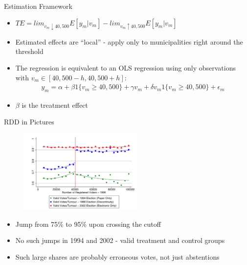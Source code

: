\documentclass[11pt,notes=hide,aspectratio=169,mathserif]{beamer}
\begin{document}
\begin{frame}{Estimation Framework}

\begin{itemize}
\item $ TE = lim_{v_m \downarrow 40,500} E[y_m| v_m] - lim_{v_m \uparrow 40,500} E[y_m| v_m] $
\item Estimated effects are ``local'' - apply only to municipalities right around the threshold
\item The regression is equivalent to an OLS regression using only observations with $v_m \in [40,500 - h, 40,500 + h]$:
\begin{align*}
    y_m = \alpha + \beta 1\{v_m \geq 40,500\} + \gamma v_m + \delta v_m 1\{v_m \geq 40,500\} + \epsilon_m
\end{align*}
\item $\beta$ is the treatment effect
\end{itemize}
\end{frame}

\begin{frame}{RDD in Pictures}
\begin{figure}
\centering
\includegraphics[width=0.55\textwidth]{inputs/fig5.png}
\end{figure}
\begin{itemize}
\pause \item Jump from 75\% to 95\% upon crossing the cutoff
\pause \item No such jumps in 1994 and 2002 - valid treatment and control groups
\pause \item Such large shares are probably erroneous votes, not just abstentions
\end{itemize}
\end{frame}
\end{document}
